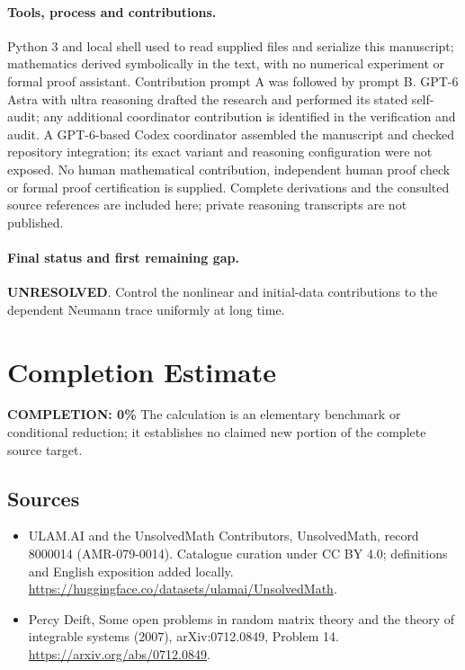 \documentclass[11pt]{article}
\begin{document}
\paragraph{Tools, process and contributions.}
Python 3 and local shell used to read supplied files and serialize this manuscript; mathematics derived symbolically in the text, with no numerical experiment or formal proof assistant. Contribution prompt A was followed by prompt B. GPT-6 Astra with ultra reasoning drafted the research and performed its stated self-audit; any additional coordinator contribution is identified in the verification and audit. A GPT-6-based Codex coordinator assembled the manuscript and checked repository integration; its exact variant and reasoning configuration were not exposed. No human mathematical contribution, independent human proof check or formal proof certification is supplied. Complete derivations and the consulted source references are included here; private reasoning transcripts are not published.

\paragraph{Final status and first remaining gap.}
\textbf{UNRESOLVED}. Control the nonlinear and initial-data contributions to the dependent Neumann trace uniformly at long time.

\section{Completion Estimate}
\noindent\textbf{COMPLETION: 0\%}
The calculation is an elementary benchmark or conditional reduction; it establishes no claimed new portion of the complete source target.

\subsection{Sources}
\begin{itemize}
\item[\hypertarget{source:8000014:1}{S1}] ULAM.AI and the UnsolvedMath Contributors, UnsolvedMath, record 8000014 (AMR-079-0014). Catalogue curation under CC BY 4.0; definitions and English exposition added locally.
\url{https://huggingface.co/datasets/ulamai/UnsolvedMath}.
\item[\hypertarget{source:8000014:2}{S2}] Percy Deift, Some open problems in random matrix theory and the theory of integrable systems (2007), arXiv:0712.0849, Problem 14.
\url{https://arxiv.org/abs/0712.0849}.
\end{itemize}
\label{end:8000014}
\end{document}

